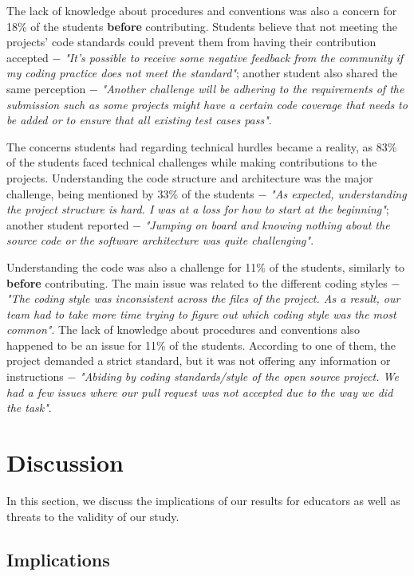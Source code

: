 \documentclass[sigconf]{acmart}
\begin{document}
\begin{sloppy}
The lack of knowledge about procedures and conventions was also a concern for 18\% of the students \textbf{before} contributing. Students believe that not meeting the projects' code standards could prevent them from having their contribution accepted $-$ \textit{"It's possible to receive some negative feedback from the community if my coding practice does not meet the standard"}; another student also shared the same perception $-$ \textit{"Another challenge will be adhering to the requirements of the submission such as some projects might have a certain code coverage that needs to be added or to ensure that all existing test cases pass"}.

The concerns students had regarding technical hurdles became a reality, as 83\% of the students faced technical challenges while making contributions to the projects. Understanding the code structure and architecture was the major challenge, being mentioned by 33\% of the students $-$ \textit{"As expected, understanding the project structure is hard. I was at a loss for how to start at the beginning"}; another student reported $-$ \textit{"Jumping on board and knowing nothing about the source code or the software architecture was quite challenging"}. 

Understanding the code was also a challenge for 11\% of the students, similarly to \textbf{before} contributing. The main issue was related to the different coding styles $-$ \textit{"The coding style was inconsistent across the files of the project. As a result, our team had to take more time trying to figure out which coding style was the most common"}. The lack of knowledge about procedures and conventions also happened to be an issue for 11\% of the students. According to one of them, the project demanded a strict standard, but it was not offering any information or instructions $-$ \textit{"Abiding by coding standards/style of the open source project. We had a few issues where our pull request was not accepted due to the way we did the task"}.

\section{Discussion}

In this section, we discuss the implications of our results for educators as well as threats to the validity of our study.

\subsection{Implications}


\end{sloppy}
\end{document}
